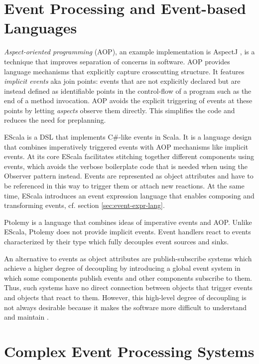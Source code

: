 \documentclass[book,type=bsc,colorback,accentcolor=tud8b,12pt,twoside]{tudthesis}
\begin{document}
\section{Event Processing and Event-based Languages}
\label{sec:event-proc-event}

\emph{Aspect-oriented programming} (AOP), an example implementation is AspectJ \cite{Kiczales:2001em}, is a technique that improves separation of concerns in software.  AOP provides language mechanisms that explicitly capture crosscutting structure.  It features \emph{implicit events} aka join points: events that are not explicitly declared but are instead defined as identifiable points in the control-flow of a program such as the end of a method invocation.  AOP avoids the explicit triggering of events at these points by letting \emph{aspects} observe them directly.  This simplifies the code and reduces the need for preplanning.  

EScala \cite{Gasiunas:2011gg} is a DSL that implements C\#-like events in Scala.  It is a language design that combines imperatively triggered events with AOP mechanisms like implicit events.  At its core EScala facilitates stitching together different components using events, which avoids the verbose boilerplate code that is needed when using the Observer pattern instead.  Events are represented as object attributes and have to be referenced in this way to trigger them or attach new reactions.  At the same time, EScala introduces an event expression language that enables composing and transforming events, cf. section \ref{sec:event-expr-lang}.  

Ptolemy \cite{Rajan:2008js} is a language that combines ideas of imperative events and AOP.  Unlike EScala, Ptolemy does not provide implicit events.  Event handlers react to events characterized by their type which fully decouples event sources and sinks.  

An alternative to events as object attributes are publish-subscribe systems \cite{Eugster:2003iha} which achieve a higher degree of decoupling by introducing a global event system in which some components publish events and other components subscribe to them.  Thus, such systems have no direct connection between objects that trigger events and objects that react to them.  However, this high-level degree of decoupling is not always desirable because it makes the software more difficult to understand and maintain \cite{Gasiunas:2011gg}.  

\section{Complex Event Processing Systems}
\label{sec:compl-event-proc}
\end{document}
